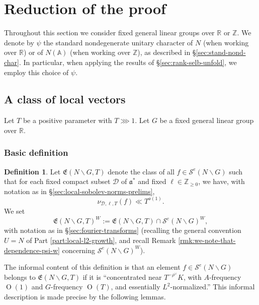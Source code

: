 \documentclass[reqno]{amsart}
\def\O{\operatorname{O}}
\theoremstyle{plain} \newtheorem{theorem} {Theorem}
\theoremstyle{definition} \newtheorem{definition} [theorem] {Definition}
\theoremstyle{itplain} %
\numberwithin{equation}{section}
\numberwithin{theorem}{section}
\renewcommand{\geq}{\geqslant}
\begin{document}
\section{Reduction of the proof}\label{sec:reduction-proof}
Throughout this section we consider fixed general linear groups over $\mathbb{R}$ or $\mathbb{Z}$.  We denote by $\psi$ the standard nondegenerate unitary character of $N$ (when working over $\mathbb{R}$) or of $N(\mathbb{A})$ (when  working over $\mathbb{Z}$), as described in \S\ref{sec:stand-nond-char}.  In particular, when applying the results of \S\ref{sec:rank-selb-unfold}, we employ this choice of $\psi$.

\subsection{A class of local vectors}
Let $T$ be a positive parameter with $T \ggg 1$.  Let $G$ be a fixed general linear group over $\mathbb{R}$.  

\subsubsection{Basic definition}

\begin{definition}
  Let $\mathfrak{E}(N \backslash G, T)$  denote the class of all $f \in \mathcal{S}^e(N \backslash G)$ such that for each fixed compact subset $\mathcal{D}$ of $\mathfrak{a}^*$ and fixed $\ell \in \mathbb{Z}_{\geq 0}$, we have, with notation as in \S\ref{sec:local-sobolev-norms-prelims},
  \begin{equation*}
    \nu_{\mathcal{D},\ell,T}(f) \ll T^{o(1)}.
  \end{equation*}
  We set
  \begin{equation*}
    \mathfrak{E}(N \backslash G, T)^W := \mathfrak{E}(N \backslash G, T) \cap \mathcal{S}^e(N \backslash G)^W,
  \end{equation*}
  with notation as in \S\ref{sec:fourier-transforms} (recalling the general convention $U = N$ of Part \ref{part:local-l2-growth}, and recall Remark \ref{rmk:we-note-that-dependence-psi-w} concerning $\mathcal{S}^e(N \backslash G)^W$).
\end{definition}

The informal content of this definition is that an element $f \in \mathcal{S}^e(N \backslash G)$ belongs to $\mathfrak{E}(N \backslash G, T)$ if it is ``concentrated near $T^{-\rho^\vee} K$, with $A$-frequency $\O(1)$ and $G$-frequency $\O(T)$, and essentially $L^2$-normalized.''  This informal description is made precise by the following lemmas.
\end{document}
